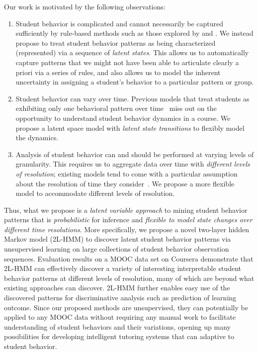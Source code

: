 Our work is motivated by the following observations:
\begin{enumerate}
  \item Student behavior is complicated and cannot necessarily be captured
      sufficiently by rule-based methods such as those explored by
      \citet{Kizilcec:2013:LAK} and \citet{Davis:2016:EDM}. We instead
      propose to treat student behavior patterns as being characterized
      (represented) via a sequence of \emph{latent states}. This allows us
      to automatically capture patterns that we might not have been able to
      articulate clearly a priori via a series of rules, and also allows us
      to model the inherent uncertainty in assigning a student's behavior
      to a particular pattern or group.
  \item Student behavior can vary over time. Previous models that treat students
      as exhibiting only one behavioral pattern over
      time~\cite{Faucon:2016:EDM} miss out on the opportunity to understand
      student behavior dynamics in a course. We propose a latent space
      model with {\em latent state transitions} to flexibly model the
      dynamics.
  \item Analysis of student behavior can and should be performed at varying
      levels of granularity. This requires us to aggregate data over time
      with \emph{different levels of resolution}; existing models tend to come
      with a particular assumption about the resolution of time they
      consider~\cite{Faucon:2016:EDM, Kizilcec:2013:LAK, Shih:2010:EDM}. We
      propose a more flexible model to accommodate different levels of
      resolution.
\end{enumerate}

Thus, what we propose is a \emph{latent variable approach} to mining student behavior
patterns that is \emph{probabilistic} for inference and 
\emph{flexible to model state changes over different time resolutions}. 
More specifically, we propose a novel two-layer hidden Markov model (2L-HMM) to
 discover latent student behavior patterns via
unsupervised learning on large collections of student behavior observation
sequences. Evaluation results on a MOOC data set on Coursera demonstrate that 2L-HMM can effectively 
discover a variety of interesting interpretable student behavior patterns at different levels of resolution, many of which are beyond what existing approaches can discover. 2L-HMM further enables easy use of the discovered patterns for discriminative analysis such as prediction of learning outcome. 
Since our proposed methods are unsupervised, they can potentially be applied to any MOOC data without requiring any manual work to facilitate understanding of student behaviors and their variations, opening up many possibilities for developing intelligent tutoring systems that can adaptive to student behavior. 


